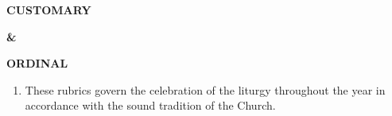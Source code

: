 
 \usepackage{lscape}
 \usepackage{longtable}
 \usepackage{arydshln}
 


	\begin{titlepage}
		\vspace*{\fill}
		
		\begin{center}
			
			\textbf{\Huge\color{black} CUSTOMARY}
			
			\textbf{\Huge\color{black} \&}
			
			\textbf{\Huge\color{black} ORDINAL}
			
		\end{center}
		
		\vspace*{\fill}
	\end{titlepage}
	
	
	
	\raggedbottom
	
	
	
	\begin{enumerate}
		\item These rubrics govern the celebration of the liturgy throughout the year in accordance with the sound tradition of the Church.
		
	\end{enumerate}
